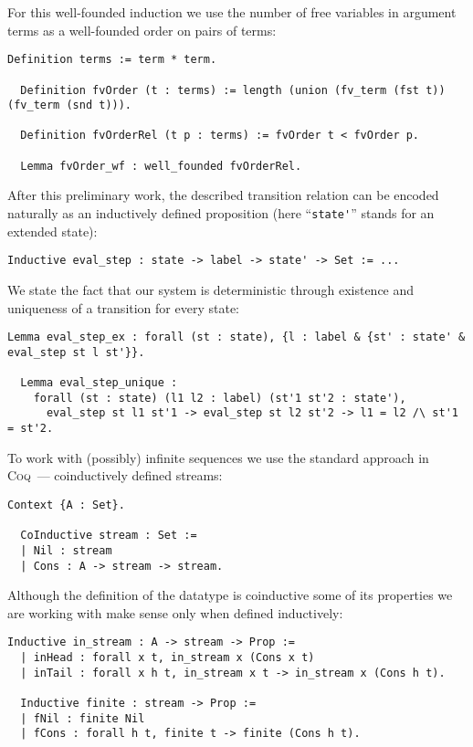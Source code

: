 For this well-founded induction we use the number of free variables in argument terms as a well-founded order on pairs of terms:

\begin{lstlisting}[language=Coq]
  Definition terms := term * term.

  Definition fvOrder (t : terms) := length (union (fv_term (fst t)) (fv_term (snd t))).

  Definition fvOrderRel (t p : terms) := fvOrder t < fvOrder p.

  Lemma fvOrder_wf : well_founded fvOrderRel.
\end{lstlisting}

After this preliminary work, the described transition relation can be encoded naturally as an inductively defined proposition (here ``\lstinline|state'|''
stands for an extended state):

\begin{lstlisting}[language=Coq]
  Inductive eval_step : state -> label -> state' -> Set := ...
\end{lstlisting}

We state the fact that our system is deterministic through existence and uniqueness of a transition for every state:

\begin{lstlisting}[language=Coq]
  Lemma eval_step_ex : forall (st : state), {l : label & {st' : state' & eval_step st l st'}}.

  Lemma eval_step_unique :
    forall (st : state) (l1 l2 : label) (st'1 st'2 : state'),
      eval_step st l1 st'1 -> eval_step st l2 st'2 -> l1 = l2 /\ st'1 = st'2.
\end{lstlisting}

To work with (possibly) infinite sequences we use the standard approach in \textsc{Coq}~--- coinductively defined streams:

\begin{lstlisting}[language=Coq]
  Context {A : Set}.

  CoInductive stream : Set :=
  | Nil : stream
  | Cons : A -> stream -> stream.
\end{lstlisting}

Although the definition of the datatype is coinductive some of its properties we are working with make sense only when defined inductively:

\begin{lstlisting}[language=Coq]
  Inductive in_stream : A -> stream -> Prop :=
  | inHead : forall x t, in_stream x (Cons x t)
  | inTail : forall x h t, in_stream x t -> in_stream x (Cons h t).

  Inductive finite : stream -> Prop :=
  | fNil : finite Nil
  | fCons : forall h t, finite t -> finite (Cons h t).
\end{lstlisting}

